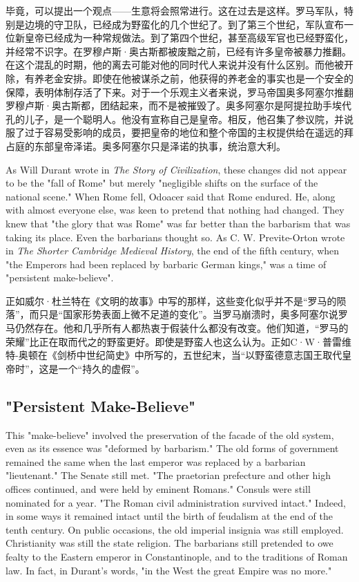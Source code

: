 \begin{Parallel}{97mm}{72mm}
  \ParallelRText
  {毕竟，可以提出一个观点——生意将会照常进行。这在过去是这样。罗马军队，特别是边境的守卫队，已经成为野蛮化的几个世纪了。到了第三个世纪，军队宣布一位新皇帝已经成为一种常规做法。到了第四个世纪，甚至高级军官也已经野蛮化，并经常不识字。在罗穆卢斯·奥古斯都被废黜之前，已经有许多皇帝被暴力推翻。在这个混乱的时期，他的离去可能对他的同时代人来说并没有什么区别。而他被开除，有养老金安排。即使在他被谋杀之前，他获得的养老金的事实也是一个安全的保障，表明体制存活了下来。对于一个乐观主义者来说，罗马帝国奥多阿塞尔推翻罗穆卢斯·奥古斯都，团结起来，而不是被摧毁了。奥多阿塞尔是阿提拉助手埃代孔的儿子，是一个聪明人。他没有宣称自己是皇帝。相反，他召集了参议院，并说服了过于容易受影响的成员，要把皇帝的地位和整个帝国的主权提供给在遥远的拜占庭的东部皇帝泽诺。奥多阿塞尔只是泽诺的执事，统治意大利。}
  \ParallelPar



  \ParallelLText
  {As Will Durant wrote in \emph{The Story of Civilization}, these changes did not appear to be the "fall of Rome" but merely "negligible shifts on the surface of the national scene." When Rome fell, Odoacer said that Rome endured. He, along with almost everyone else, was keen to pretend that nothing had changed. They knew that "the glory that was Rome" was far better than the barbarism that was taking its place. Even the barbarians thought so. As C. W. Previte-Orton wrote in \emph{The Shorter Cambridge Medieval History}, the end of the fifth century, when "the Emperors had been replaced by barbaric German kings," was a time of "persistent make-believe".}
  
  \ParallelRText
  {正如威尔·杜兰特在《文明的故事》中写的那样，这些变化似乎并不是“罗马的陨落”，而只是“国家形势表面上微不足道的变化”。当罗马崩溃时，奥多阿塞尔说罗马仍然存在。他和几乎所有人都热衷于假装什么都没有改变。他们知道，“罗马的荣耀”比正在取而代之的野蛮更好。即使是野蛮人也这么认为。正如C·W·普雷维特-奥顿在《剑桥中世纪简史》中所写的，五世纪末，当“以野蛮德意志国王取代皇帝时”，这是一个“持久的虚假”。}
  \ParallelPar

  \subsection{"Persistent Make-Believe"}

  \ParallelLText
  {This "make-believe" involved the preservation of the facade of the old system, even as its essence was "deformed by barbarism." The old forms of government remained the same when the last emperor was replaced by a barbarian "lieutenant." The Senate still met. "The praetorian prefecture and other high offices continued, and were held by eminent Romans." Consuls were still nominated for a year. "The Roman civil administration survived intact." Indeed, in some ways it remained intact until the birth of feudalism at the end of the tenth century. On public occasions, the old imperial insignia was still employed. Christianity was still the state religion. The barbarians still pretended to owe fealty to the Eastern emperor in Constantinople, and to the traditions of Roman law. In fact, in Durant's words, "in the West the great Empire was no more." }
  

\end{Parallel}
